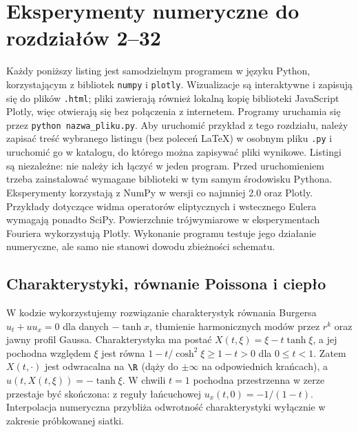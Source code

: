 \chapter{Eksperymenty numeryczne do rozdziałów 2--32}
\label{chap:pde-code}

Każdy poniższy listing jest samodzielnym programem w języku Python,
korzystającym z bibliotek \texttt{numpy} i \texttt{plotly}.
Wizualizacje są interaktywne i zapisują się do plików \texttt{.html};
pliki zawierają również lokalną kopię biblioteki JavaScript Plotly,
więc otwierają się bez połączenia z internetem.
Programy uruchamia się przez \texttt{python nazwa\_pliku.py}.
Aby uruchomić przykład z tego rozdziału, należy
zapisać treść wybranego listingu (bez poleceń LaTeX)
w osobnym pliku \texttt{.py} i uruchomić go w katalogu,
do którego można zapisywać pliki wynikowe.
Listingi są niezależne: nie należy ich łączyć w jeden
program. Przed uruchomieniem trzeba zainstalować
wymagane biblioteki w tym samym środowisku Pythona. Eksperymenty korzystają
z NumPy w wersji co najmniej 2.0 oraz Plotly. Przykłady
dotyczące widma operatorów eliptycznych i wstecznego Eulera
wymagają ponadto SciPy. Powierzchnie trójwymiarowe
w eksperymentach Fouriera wykorzystują Plotly. Wykonanie programu testuje jego działanie
numeryczne, ale samo nie stanowi dowodu zbieżności schematu.

\section{Charakterystyki, równanie Poissona i ciepło}
W kodzie wykorzystujemy rozwiązanie charakterystyk
równania Burgersa $u_t+uu_x=0$ dla danych $-\tanh x$,
tłumienie harmonicznych modów przez $r^k$ oraz
jawny profil Gaussa. Charakterystyka ma postać
$X(t,\xi)=\xi-t\tanh\xi$, a jej pochodna względem
$\xi$ jest równa $1-t/\cosh^2\xi\ge1-t>0$
dla $0\le t<1$. Zatem $X(t,\cdot)$ jest odwracalna
na $\R$ (dąży do $\pm\infty$ na odpowiednich krańcach),
a $u(t,X(t,\xi))=-\tanh\xi$.
W chwili $t=1$ pochodna przestrzenna w zerze
przestaje być skończona: z reguły łańcuchowej
$u_x(t,0)=-1/(1-t)$.
Interpolacja numeryczna przybliża odwrotność
charakterystyki wyłącznie w zakresie próbkowanej siatki.

